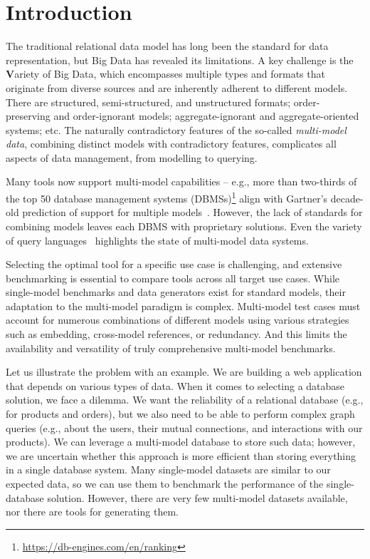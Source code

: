 \section{Introduction}

The traditional relational data model has long been the standard for data representation, but Big Data has revealed its limitations. A key challenge is the \textbf{V}ariety of Big Data, which encompasses multiple types and formats that originate from diverse sources and are inherently adherent to different models. There are structured, semi-structured, and unstructured formats; order-preserving and order-ignorant models; aggregate-ignorant and aggregate-oriented systems; etc. The naturally contradictory features of the so-called \textit{multi-model data}, combining distinct models with contradictory features, complicates all aspects of data management, from modelling to querying. 

Many tools now support multi-model capabilities -- e.g., more than two-thirds of the top 50 database management systems (DBMSs)\footnote{\url{https://db-engines.com/en/ranking}} align with Gartner's decade-old prediction of support for multiple models~\citep{Gartner2015}. However, the lack of standards for combining models leaves each DBMS with proprietary solutions. Even the variety of query languages~\citep{Jiaheng2023Survey} highlights the state of multi-model data systems.

Selecting the optimal tool for a specific use case is challenging, and extensive benchmarking is essential to compare tools across all target use cases. While single-model benchmarks and data generators exist for standard models, their adaptation to the multi-model paradigm is complex. Multi-model test cases must account for numerous combinations of different models using various strategies such as embedding, cross-model references, or redundancy. And this limits the availability and versatility of truly comprehensive multi-model benchmarks.~\citep{CSUR-Jiaheng,unibench}


Let us illustrate the problem with an example. We are building a web application that depends on various types of data. When it comes to selecting a database solution, we face a dilemma. We want the reliability of a relational database (e.g., for products and orders), but we also need to be able to perform complex graph queries (e.g., about the users, their mutual connections, and interactions with our products). We can leverage a multi-model database to store such data; however, we are uncertain whether this approach is more efficient than storing everything in a single database system. Many single-model datasets are similar to our expected data, so we can use them to benchmark the performance of the single-database solution. However, there are very few multi-model datasets available, nor there are tools for generating them.


